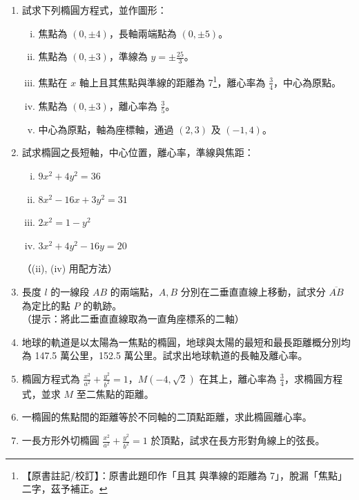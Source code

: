 \begin{enumerate}
  \item 試求下列橢圓方程式，並作圖形：
  \begin{enumerate}[(i)]
    \item 焦點為 $(0, \pm 4)$，長軸兩端點為 $(0, \pm 5)$。
    \item 焦點為 $(0, \pm 3)$，準線為 $y = \pm \frac{25}{3}$。
    \item 焦點在 $x$ 軸上且其焦點與準線的距離為 7\label{note:b4-ch3-ex1-1-3}\footnote{【原書註記/校訂】：原書此題印作「且其 與準線的距離為 7」，脫漏「焦點」二字，茲予補正。}，離心率為 $\frac{3}{4}$，中心為原點。
    \item 焦點為 $(0, \pm 3)$，離心率為 $\frac{3}{5}$。
    \item[*(\roman{enumii})] 中心為原點，軸為座標軸，通過 $(2,3)$ 及 $(-1,4)$。
  \end{enumerate}

  \item 試求橢圓之長短軸，中心位置，離心率，準線與焦距：
  \begin{enumerate}[(i)]
    \item $9x^2 + 4y^2 = 36$
    \item $8x^2 - 16x + 3y^2 = 31$
    \item $2x^2 = 1 - y^2$
    \item $3x^2 + 4y^2 - 16y = 20$
  \end{enumerate}
  （(ii), (iv) 用配方法）

  \item 長度 $l$ 的一線段 $AB$ 的兩端點，$A, B$ 分別在二垂直直線上移動，試求分 $\overline{AB}$ 為定比的點 $P$ 的軌跡。\\
  （提示：將此二垂直直線取為一直角座標系的二軸）

  \item 地球的軌道是以太陽為一焦點的橢圓，地球與太陽的最短和最長距離概分別均為 147.5 萬公里，152.5 萬公里。試求出地球軌道的長軸及離心率。

  \item[*\theenumi.] 橢圓方程式為 $\frac{x^2}{a^2} + \frac{y^2}{b^2} = 1$，$M(-4,\sqrt{2})$ 在其上，離心率為 $\frac{3}{4}$，求橢圓方程式，並求 $M$ 至二焦點的距離。

  \item 一橢圓的焦點間的距離等於不同軸的二頂點距離，求此橢圓離心率。

  \item 一長方形外切橢圓 $\frac{x^2}{a^2} + \frac{y^2}{b^2} = 1$ 於頂點，試求在長方形對角線上的弦長。


\end{enumerate}
